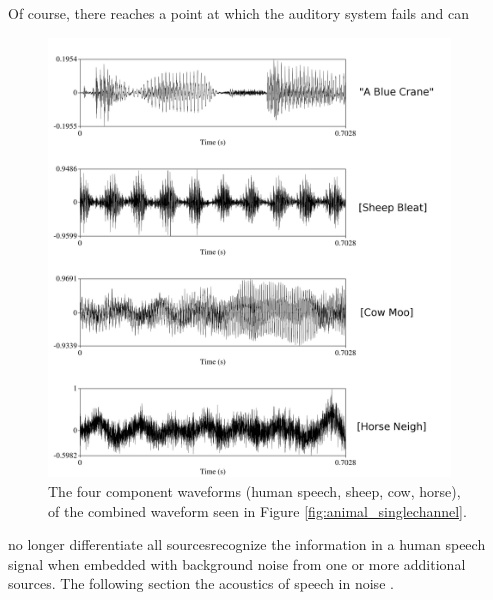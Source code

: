 Of course, there reaches a point at which the auditory system fails and can
%
\DIFdelbegin %
\DIFdelend \DIFaddbegin \begin{figure}[h!]
\DIFaddendFL \centering
  \DIFdelbeginFL %
\DIFdelendFL \DIFaddbeginFL \includegraphics[width=0.95\textwidth]{figure/animal_multichannel-w-text.png}
  \DIFaddendFL \caption{The four component waveforms (human speech, sheep, cow, horse), of the combined waveform seen in Figure \ref{fig:animal_singlechannel}.}
  \label{fig:animal_multichannel}
\end{figure}
%
 no longer differentiate all sources\DIFdelbegin {}\DIFdelend \DIFaddbegin {}\DIFaddend recognize the information in a human speech signal when embedded with background noise from one or more additional sources.  The following section \DIFdelbegin {}\DIFdelend \DIFaddbegin {}\DIFaddend the acoustics of speech in noise \DIFaddbegin {}\DIFaddend .

